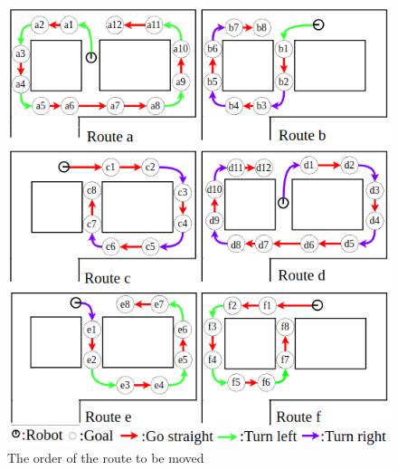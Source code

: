 \vspace{1cm}

\begin{figure}[hbtp]
  \centering
 \includegraphics[keepaspectratio, scale=0.6]
      {images/route.png}
 \caption{The order of the route to be moved}
 \label{Fig:route}
\end{figure}

\newpage
